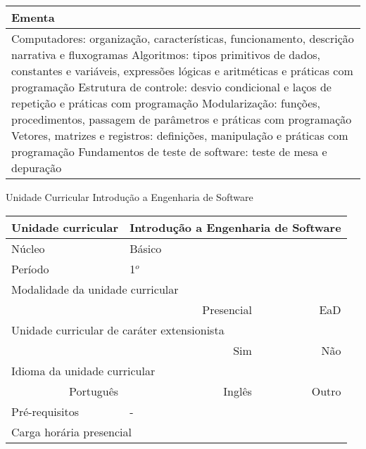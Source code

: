 \begin{quadro}[ht!]
\begin{tabular}{|p{3cm} p{2cm} p{3cm} p{2cm} p{3cm} p{2cm}|}
\multicolumn{6}{|p{15cm}|}{\cellcolor{blue1} Ementa} \\\hline
\hline\multicolumn{6}{|p{15cm}|}{\scriptsize Computadores: organização, características, funcionamento, descrição narrativa e fluxogramas Algoritmos: tipos primitivos de dados, constantes e variáveis, expressões lógicas e aritméticas e práticas com programação Estrutura de controle: desvio condicional e laços de repetição e práticas com programação Modularização: funções, procedimentos, passagem de parâmetros e práticas com programação Vetores, matrizes e registros: definições, manipulação e práticas com programação Fundamentos de teste de software: teste de mesa e depuração}\\\hline
\hline
	\end{tabular}
\end{quadro}
\begin{quadro}[ht!]
  \centering\scriptsize
\caption{Unidade Curricular Introdução a Engenharia de Software}
\label{ unit_1 }
\begin{tabular}{|p{3cm} p{2cm} p{3cm} p{2cm} p{3cm} p{2cm}|}\hline
\multicolumn{1}{|p{3cm}|}{\cellcolor{blue1} Unidade curricular} & \multicolumn{5}{p{9cm}|}{ Introdução a Engenharia de Software }\\\hline
\multicolumn{1}{|p{3cm}|}{\cellcolor{blue1} Núcleo} & \multicolumn{5}{p{11.5cm}|}{ Básico }\\\hline
\multicolumn{1}{|p{3cm}|}{\cellcolor{blue1} Período} & \multicolumn{5}{p{9cm}|}{ 1$^o$ }\\\hline
\multicolumn{6}{|p{15cm}|}{\cellcolor{blue1} Modalidade da unidade curricular} \\\hline
\multicolumn{2}{|r}{		} &  \multicolumn{2}{r}{Presencial \XBox } & \multicolumn{2}{r|}{EaD \Square	} \\\hline
\multicolumn{6}{|p{15cm}|}{\cellcolor{blue1} Unidade curricular de caráter extensionista} \\\hline
\multicolumn{4}{|r}{			Sim \Square	} & \multicolumn{2}{r|}{	Não \XBox	}\\\hline
\multicolumn{6}{|p{15cm}|}{\cellcolor{blue1} Idioma da unidade curricular} \\ \hline
\multicolumn{2}{|r}{	Português \XBox	} &  \multicolumn{2}{r}{	Inglês \Square	} & \multicolumn{2}{r|}{	Outro \Square	} \\ \hline
\multicolumn{1}{|p{3cm}|}{\cellcolor{blue1} Pré-requisitos} & \multicolumn{5}{p{9cm}|}{ - }\\ \hline
\multicolumn{6}{|p{15cm}|}{\cellcolor{blue1} Carga horária presencial} \\ \hline

\end{tabular}
\end{quadro}

